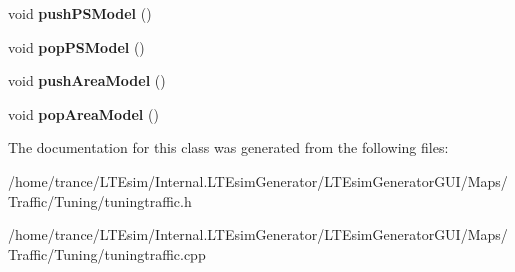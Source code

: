 \begin{DoxyCompactItemize}
\item 
void {\bfseries push\+P\+S\+Model} ()\hypertarget{class_tuningtraffic_a6fad2bb5f61667fae3785b0f61ab7cc1}{}\label{class_tuningtraffic_a6fad2bb5f61667fae3785b0f61ab7cc1}

\item 
void {\bfseries pop\+P\+S\+Model} ()\hypertarget{class_tuningtraffic_a675b94c56f652d537cc2682be7bb252d}{}\label{class_tuningtraffic_a675b94c56f652d537cc2682be7bb252d}

\item 
void {\bfseries push\+Area\+Model} ()\hypertarget{class_tuningtraffic_a976b5bc2aa87f022a2f2edbf936e46b7}{}\label{class_tuningtraffic_a976b5bc2aa87f022a2f2edbf936e46b7}

\item 
void {\bfseries pop\+Area\+Model} ()\hypertarget{class_tuningtraffic_af5a6acdb756ae5e794470278b1ec03d8}{}\label{class_tuningtraffic_af5a6acdb756ae5e794470278b1ec03d8}

\end{DoxyCompactItemize}


The documentation for this class was generated from the following files\+:\begin{DoxyCompactItemize}
\item 
/home/trance/\+L\+T\+Esim/\+Internal.\+L\+T\+Esim\+Generator/\+L\+T\+Esim\+Generator\+G\+U\+I/\+Maps/\+Traffic/\+Tuning/tuningtraffic.\+h\item 
/home/trance/\+L\+T\+Esim/\+Internal.\+L\+T\+Esim\+Generator/\+L\+T\+Esim\+Generator\+G\+U\+I/\+Maps/\+Traffic/\+Tuning/tuningtraffic.\+cpp\end{DoxyCompactItemize}
